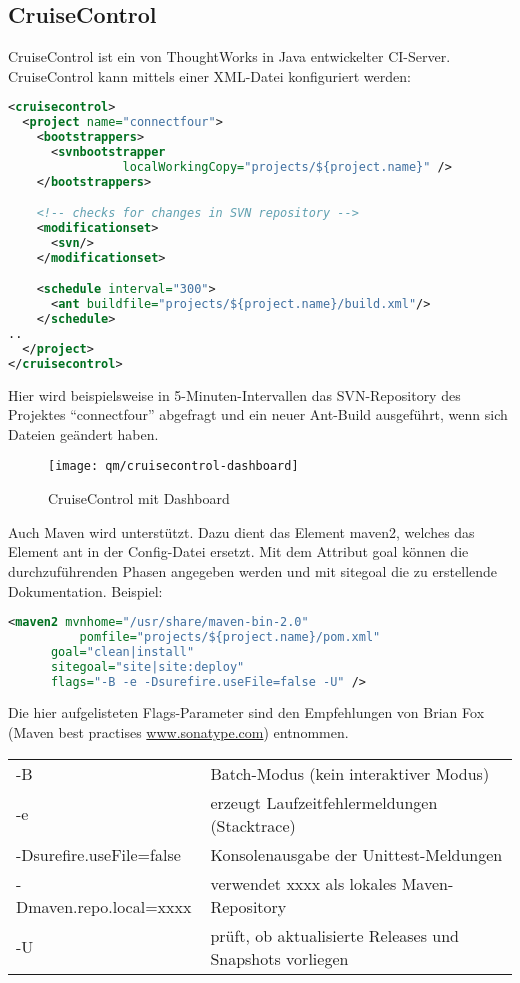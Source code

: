 \subsection{CruiseControl}
CruiseControl ist ein von ThoughtWorks in Java entwickelter
CI-Server.
CruiseControl kann mittels einer XML-Datei konfiguriert werden:
\begin{lstlisting}[language=xml,
morekeywords={cruisecontrol,project,bootstrappers,svnbootstrapper,modificationset,svn,schedule,ant}]
<cruisecontrol>
  <project name="connectfour">
    <bootstrappers>
      <svnbootstrapper
                localWorkingCopy="projects/${project.name}" />
    </bootstrappers>

    <!-- checks for changes in SVN repository -->
    <modificationset>
      <svn/>
    </modificationset>

    <schedule interval="300">
      <ant buildfile="projects/${project.name}/build.xml"/>
    </schedule>
..
  </project>
</cruisecontrol>
\end{lstlisting}
Hier wird beispielsweise in 5-Minuten-Intervallen das SVN-Repository
des Projektes ``connectfour'' abgefragt und ein neuer Ant-Build
ausgeführt, wenn sich Dateien geändert haben.
\begin{figure}[H]
\texttt{[image: qm/cruisecontrol-dashboard]}
\caption{CruiseControl mit Dashboard}
%
\label{fig:cruisecontrol}
\end{figure}
\newslide
Auch Maven wird unterstützt. Dazu dient das Element maven2, welches
das Element ant in der Config-Datei ersetzt. Mit dem Attribut goal können die
durchzuführenden Phasen angegeben werden und mit sitegoal die zu
erstellende Dokumentation. Beispiel:
\begin{lstlisting}[language=xml,morekeywords={maven2}]
  <maven2 mvnhome="/usr/share/maven-bin-2.0"
          pomfile="projects/${project.name}/pom.xml"
	  goal="clean|install"
	  sitegoal="site|site:deploy"
	  flags="-B -e -Dsurefire.useFile=false -U" />
\end{lstlisting}
\newslide
Die hier aufgelisteten Flags-Parameter sind den Empfehlungen von
Brian Fox (Maven best practises
  \href{http://www.sonatype.com}{www.sonatype.com}) entnommen.
\begin{center}
\begin{tabular}{ll}
 -B & Batch-Modus (kein interaktiver Modus)\\
 -e & erzeugt Laufzeitfehlermeldungen (Stacktrace)\\
 -Dsurefire.useFile=false & Konsolenausgabe der Unittest-Meldungen\\
 -Dmaven.repo.local=xxxx & verwendet xxxx als lokales Maven-Repository\\
 -U & prüft, ob aktualisierte Releases und Snapshots vorliegen\\
\end{tabular}
\end{center}
